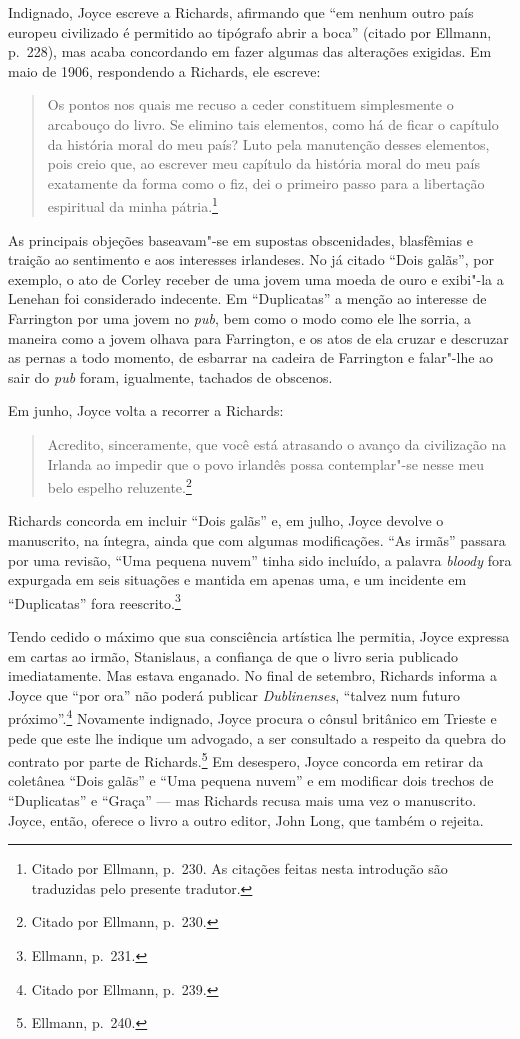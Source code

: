 Indignado, Joyce escreve a Richards, afirmando que “em nenhum outro país europeu
civilizado é permitido ao tipógrafo abrir a boca” (citado por Ellmann, p.~228),
mas acaba concordando em fazer algumas das alterações exigidas. Em maio de
1906, respondendo a Richards, ele escreve: 

\begin{quote}
Os pontos nos quais me recuso a ceder constituem simplesmente o arcabouço do
livro. Se elimino tais elementos, como há de ficar o capítulo da história moral
do meu país? Luto pela manutenção desses elementos, pois creio que, ao escrever
meu capítulo da história moral do meu país exatamente da forma como o fiz, dei
o primeiro passo para a libertação espiritual da minha pátria.\footnote{  Citado por
Ellmann, p.~230. As citações feitas nesta introdução são traduzidas
pelo presente tradutor.}
\end{quote}

As principais objeções baseavam"-se em supostas obscenidades, blasfêmias e
traição ao sentimento e aos interesses irlandeses.  No já citado “Dois galãs”,
por exemplo, o ato de Corley receber de uma jovem uma moeda de ouro e exibi"-la
a Lenehan foi considerado indecente. Em “Duplicatas” a menção ao interesse de
Farrington por uma jovem no \textit{pub}, bem como o modo como ele lhe sorria,
a maneira como a jovem olhava para Farrington, e os atos de ela cruzar e
descruzar as pernas a todo momento, de esbarrar na cadeira de Farrington e
falar"-lhe ao sair do \textit{pub} foram, igualmente, tachados de obscenos.

Em junho, Joyce volta a recorrer a Richards: 

\begin{quote}
Acredito, sinceramente, que você está atrasando o avanço da civilização na Irlanda ao 
impedir que o povo irlandês possa contemplar"-se nesse meu belo espelho reluzente.\footnote{ Citado por
Ellmann, p.~230.} 
\end{quote}

Richards concorda em incluir “Dois galãs” e, em julho, Joyce
devolve o manuscrito, na íntegra, ainda que com algumas modificações. “As
irmãs” passara por uma revisão, “Uma pequena nuvem” tinha sido incluído, a
palavra \textit{bloody} fora expurgada em seis situações e mantida em apenas
uma, e um incidente em “Duplicatas” fora reescrito.\footnote{ Ellmann, p.~231.}

Tendo cedido o máximo que sua consciência artística lhe permitia, Joyce expressa
em cartas ao irmão, Stanislaus, a confiança de que o livro seria publicado
imediatamente. Mas estava enganado. No final de setembro, Richards informa a
Joyce que “por ora” não poderá publicar \textit{Dublinenses}, “talvez num futuro
próximo”.\footnote{ Citado por Ellmann, p.~239.} Novamente indignado, Joyce procura o
cônsul britânico em Trieste e pede que este lhe indique um advogado, a ser
consultado a respeito da quebra do contrato por parte de Richards.\footnote{ Ellmann, p.~240.} 
Em desespero, Joyce concorda em retirar da coletânea “Dois galãs” e “Uma
pequena nuvem” e em modificar dois trechos de “Duplicatas” e “Graça” --- mas
Richards recusa mais uma vez o manuscrito. Joyce, então, oferece o livro a
outro editor, John Long, que também o rejeita.

